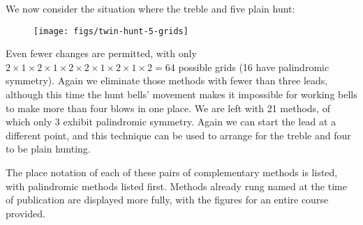 We now consider the situation where the treble and five plain hunt:

\begin{figure}[h]
  \centering
  \texttt{[image: figs/twin-hunt-5-grids]}
\end{figure}

Even fewer changes are permitted, with only
\(2\times1\times2\times1\times2\times2\times1\times2\times1\times2 = 64\)
possible grids (16 have palindromic symmetry).
Again we eliminate those methods with fewer than three leads,
although this time the hunt bells’ movement makes it impossible for working
bells to make more than four blows in one place.
We are left with 21 methods, of which only 3 exhibit palindromic symmetry.
Again we can start the lead at a different point, and this technique can be used
to arrange for the treble and four to be plain hunting.

The place notation of each of these pairs of complementary methods is listed,
with palindromic methods listed first.
Methods already rung named at the time of publication are displayed more fully,
with the figures for an entire course provided.

